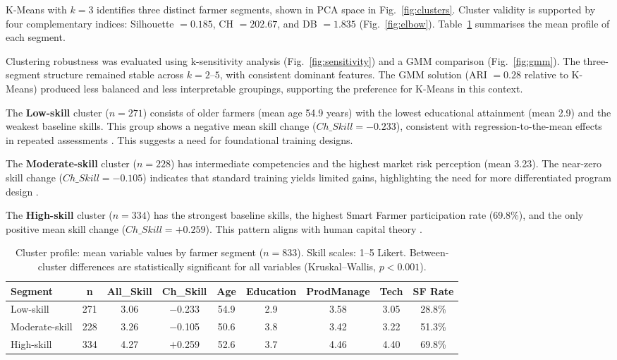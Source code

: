 \documentclass[3p,twocolumn,authoryear]{elsarticle}
\begin{document}
K-Means with $k = 3$ identifies three distinct farmer segments, shown in PCA
space in Fig.~\ref{fig:clusters}. Cluster validity is supported by four
complementary indices: Silhouette $= 0.185$, CH $= 202.67$, and DB $= 1.835$
(Fig.~\ref{fig:elbow}). Table~\ref{tab:cluster_profile} summarises the mean
profile of each segment.

Clustering robustness was evaluated using k-sensitivity analysis
(Fig.~\ref{fig:sensitivity}) and a GMM comparison (Fig.~\ref{fig:gmm}). The
three-segment structure remained stable across $k = 2$--$5$, with consistent
dominant features. The GMM solution (ARI $= 0.28$ relative to K-Means) produced
less balanced and less interpretable groupings, supporting the preference for
K-Means in this context.

The \textbf{Low-skill} cluster ($n = 271$) consists of older farmers (mean age
54.9 years) with the lowest educational attainment (mean 2.9) and the weakest
baseline skills. This group shows a negative mean skill change
($Ch\_Skill = -0.233$), consistent with regression-to-the-mean effects in
repeated assessments \citep{davis2012}. This suggests a need for foundational
training designs.

The \textbf{Moderate-skill} cluster ($n = 228$) has intermediate competencies
and the highest market risk perception (mean 3.23). The near-zero skill change
($Ch\_Skill = -0.105$) indicates that standard training yields limited gains,
highlighting the need for more differentiated program design
\citep{anderson2004}.

The \textbf{High-skill} cluster ($n = 334$) has the strongest baseline skills,
the highest Smart Farmer participation rate (69.8\%), and the only positive mean
skill change ($Ch\_Skill = +0.259$). This pattern aligns with human capital
theory \citep{feder1985,davis2012}.

\begin{table}[htbp]
\centering
\caption{Cluster profile: mean variable values by farmer segment
($n = 833$). Skill scales: 1--5 Likert. Between-cluster differences
are statistically significant for all variables (Kruskal--Wallis,
$p < 0.001$).}
\label{tab:cluster_profile}
\begin{tabular}{@{}lcccccccc@{}}
\toprule
\textbf{Segment} & \textbf{n} & \textbf{All\_Skill}
& \textbf{Ch\_Skill} & \textbf{Age}
& \textbf{Education} & \textbf{ProdManage}
& \textbf{Tech} & \textbf{SF Rate} \\
\midrule
Low-skill      & 271 & 3.06 & $-$0.233 & 54.9 & 2.9 & 3.58 & 3.05 & 28.8\% \\
Moderate-skill & 228 & 3.26 & $-$0.105 & 50.6 & 3.8 & 3.42 & 3.22 & 51.3\% \\
High-skill     & 334 & 4.27 & $+$0.259 & 52.6 & 3.7 & 4.46 & 4.40 & 69.8\% \\
\bottomrule
\end{tabular}
\end{table}
\end{document}
